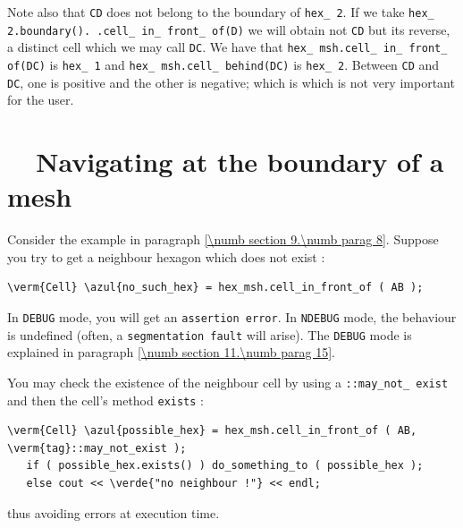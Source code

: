 Note also that {\small\tt CD} does not belong to the boundary of {\small\tt hex\_\,2}.
If we take {\small\tt hex\_\,2.boundary(). .cell\_\,in\_\,front\_\,of(D)} we will obtain not
{\small\tt CD} but its reverse, a distinct cell which we may call {\small\tt DC}.
We have that {\small\tt hex\_\,msh.cell\_\,in\_\,front\_\,of(DC)} is {\small\tt hex\_\,1} and
{\small\tt hex\_\,msh.cell\_\,behind(DC)} is {\small\tt hex\_\,2}.
Between {\small\tt CD} and {\small\tt DC}, one is positive and the other is negative;
which is which is not very important for the user.


\section{~~Navigating at the boundary of a mesh}\label{\numb section 9.\numb parag 9}

Consider the example in paragraph \ref{\numb section 9.\numb parag 8}.
Suppose you try to get a neighbour hexagon which does not exist :

\begin{Verbatim}[commandchars=\\\{\},formatcom=\small\tt,
   baselinestretch=0.94,framesep=2mm                      ]
   \verm{Cell} \azul{no_such_hex} = hex_msh.cell_in_front_of ( AB );
\end{Verbatim}

In {\small\tt DEBUG} mode, you will get an {\small\tt assertion error}.
In {\small\tt NDEBUG} mode, the behaviour is undefined
(often, a {\small\tt segmentation fault} will arise).
The {\small\tt DEBUG} mode is explained in paragraph \ref{\numb section 11.\numb parag 15}.

You may check the existence of the neighbour cell by using a
{\small\tt {}::may\_\;not\_\,exist} and then the cell's method {\small\tt exists} :

\begin{Verbatim}[commandchars=\\\{\},formatcom=\small\tt,
   baselinestretch=0.94,framesep=2mm                      ]
   \verm{Cell} \azul{possible_hex} = hex_msh.cell_in_front_of ( AB, \verm{tag}::may_not_exist );
   if ( possible_hex.exists() ) do_something_to ( possible_hex );
   else cout << \verde{"no neighbour !"} << endl;
\end{Verbatim}

\noindent thus avoiding errors at execution time.

